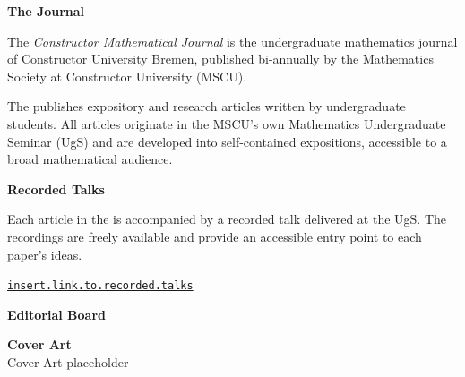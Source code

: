 \clearpage
\thispagestyle{frontmatter}

\def\internal{0.3cm}
\def\external{0.7cm}

\begin{minipage}[t]{0.47\textwidth}

  {\large\bfseries\color{cmjcrimson}The Journal}

  \vspace{\internal}

  The \textit{Constructor Mathematical Journal} {} is the
  undergraduate mathematics journal of Constructor University Bremen, published
  bi-annually by the Mathematics Society at Constructor University (MSCU).

  \vspace{0.4cm}

  The {\color{cmjcrimson}{CMJ}} publishes expository and research articles written by undergraduate students. All articles originate in the MSCU's own Mathematics
  Undergraduate Seminar (UgS) and are developed into self-contained expositions,
  accessible to a broad mathematical audience.

  \vspace{\external}
  
  {\large\bfseries\color{cmjcrimson}Recorded Talks}

  \vspace{\internal}

  Each article in the {\color{cmjcrimson}{CMJ}} is accompanied by a recorded talk delivered
  at the UgS. The recordings are freely
  available and provide an accessible entry point to each paper's ideas.

  \vspace{\internal}

  \noindent
  \href{hyper.link}
  {\texttt{insert.link.to.recorded.talks}}

  \vspace{\external}

  {\large\bfseries\color{cmjcrimson}Editorial Board}

  \vspace{\internal}

  

  \vspace{\external}

  {\large\bfseries\color{cmjcrimson}Cover Art}\\
    Cover Art placeholder
\end{minipage}
